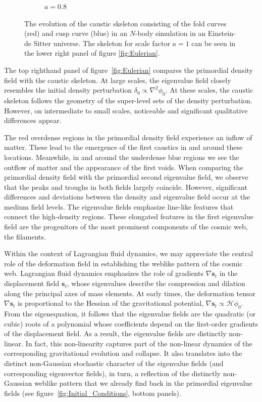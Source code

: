 \documentclass[a4paper, 11pt]{article}
\begin{document}
\begin{figure}
\begin{subfigure}[b]{0.49\textwidth}
\caption{$a=0.8$}
\end{subfigure}
\caption{The evolution of the caustic skeleton consisting of the fold curves (red) and cusp curve (blue) in an $N$-body simulation in an Einstein-de Sitter universe. The skeleton for scale factor $a=1$ can be seen in the lower right panel of figure \ref{fig:Eulerian}.}
\label{fig:Eulerian_Evolution}
\end{figure}

\bigskip
The top righthand panel of figure~\ref{fig:Eulerian} compares the primordial density field with the caustic skeleton. At large scales, the eigenvalue field closely resembles the initial density perturbation $\delta_0 \propto \nabla^2\phi_0$. At these scales, the caustic skeleton follows the geometry of the super-level sets of the density perturbation. However, on intermediate to small scales, noticeable and significant qualitative differences appear. 

The red overdense regions in the primordial density field experience an inflow of matter. These lead to the emergence of the first caustics in and around these locations. Meanwhile, in and around the underdense blue regions we see the outflow of matter and the appearance of the first voids. When comparing the primordial density field with the primordial second eigenvalue field, we observe that the peaks and troughs in both fields largely coincide. However, significant differences and deviations between the density and eigenvalue field occur at the medium field levels. The eigenvalue fields emphasize line-like features that connect the high-density regions. These elongated features in the first eigenvalue field are the progenitors of the most prominent components of the cosmic web, the filaments. 

Within the context of Lagrangian fluid dynamics, we may appreciate the central role of the deformation field in establishing the weblike pattern of the cosmic web. Lagrangian fluid dynamics emphasizes the role of gradients $\nabla \bm{s}_t$ in the displacement field $\bm{s}_t$, whose eigenvalues describe the compression and dilation along the principal axes of mass elements. At early times, the deformation tensor $\nabla \bm{s}_t$ is proportional to the Hessian of the gravitational potential, $\nabla \bm{s}_t \propto \mathcal{H}\phi_0$. From the eigenequation, it follows that the eigenvalue fields are the quadratic (or cubic) roots of a polynomial whose coefficients depend on the first-order gradients of the displacement field. As a result, the eigenvalue fields are distinctly non-linear. In fact, this non-linearity captures part of the non-linear dynamics of the corresponding gravitational evolution and collapse. It also translates into the distinct non-Gaussian stochastic character of the eigenvalue fields (and corresponding eigenvector fields), in turn, a reflection of the distinctly non-Gaussian weblike pattern that we already find back in the primordial eigenvalue fields (see figure~\ref{fig:Initial_Conditions}, bottom panels).
\end{document}
